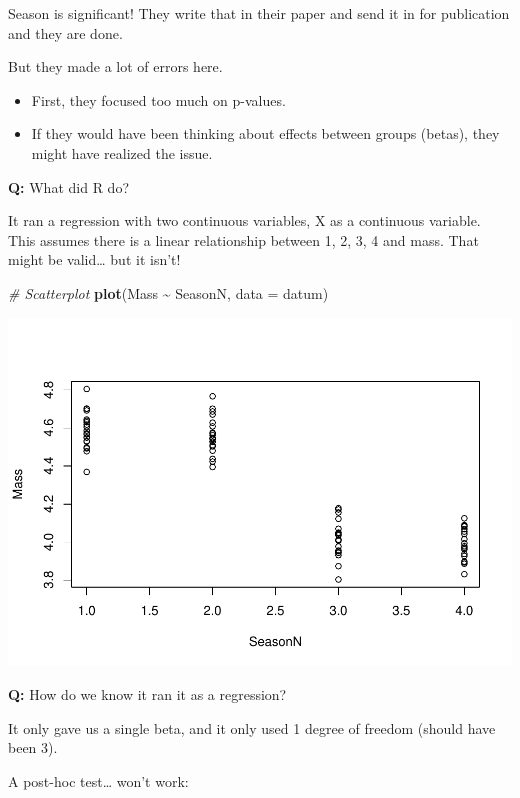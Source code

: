 \documentclass[
]{article}
\newenvironment{Shaded}{\begin{snugshade}}{\end{snugshade}}
\newcommand{\AttributeTok}[1]{\textcolor[rgb]{0.13,0.29,0.53}{#1}}
\newcommand{\CommentTok}[1]{\textcolor[rgb]{0.56,0.35,0.01}{\textit{#1}}}
\newcommand{\FunctionTok}[1]{\textcolor[rgb]{0.13,0.29,0.53}{\textbf{#1}}}
\newcommand{\NormalTok}[1]{#1}
\newcommand{\SpecialCharTok}[1]{\textcolor[rgb]{0.81,0.36,0.00}{\textbf{#1}}}
\providecommand{\tightlist}{%
  \setlength{\itemsep}{0pt}\setlength{\parskip}{0pt}}
\begin{document}
Season is significant! They write that in their paper and send it in for
publication and they are done.

But they made a lot of errors here.

\begin{itemize}
\tightlist
\item
  First, they focused too much on p-values.
\item
  If they would have been thinking about effects between groups (betas),
  they might have realized the issue.
\end{itemize}

\textbf{Q:} What did R do?

It ran a regression with two continuous variables, X as a continuous
variable. This assumes there is a linear relationship between 1, 2, 3, 4
and mass. That might be valid\ldots{} but it isn't!

\begin{Shaded}
\begin{Highlighting}[]
\CommentTok{\# Scatterplot}
\FunctionTok{plot}\NormalTok{(Mass }\SpecialCharTok{\textasciitilde{}}\NormalTok{ SeasonN, }\AttributeTok{data =}\NormalTok{ datum)}
\end{Highlighting}
\end{Shaded}

\includegraphics{lecture_10_files/figure-latex/seasons-10-1.pdf}

\textbf{Q:} How do we know it ran it as a regression?

It only gave us a single beta, and it only used 1 degree of freedom
(should have been 3).

A post-hoc test\ldots{} won't work:
\end{document}
